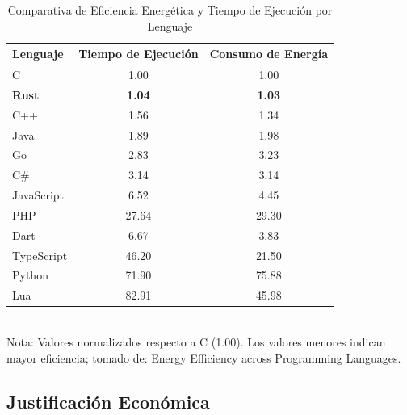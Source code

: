     \begin{table}[H]
        \centering
        \caption{Comparativa de Eficiencia Energética y Tiempo de Ejecución por Lenguaje \parencite{bib:Pereira2017}}
        \label{tab:energy_efficiency}
        \begin{tabular}{l c c} %
            \toprule
            \textbf{Lenguaje} & \textbf{Tiempo de Ejecución} & \textbf{Consumo de Energía} \\
            \midrule
            C           & 1.00  & 1.00 \\
            \textbf{Rust} & \textbf{1.04} & \textbf{1.03} \\
            C++         & 1.56  & 1.34 \\
            Java        & 1.89  & 1.98 \\
            Go          & 2.83  & 3.23 \\
            C\#         & 3.14  & 3.14 \\
            JavaScript  & 6.52  & 4.45 \\
            PHP         & 27.64 & 29.30 \\
            Dart        & 6.67  & 3.83 \\
            TypeScript  & 46.20 & 21.50 \\
            Python      & 71.90 & 75.88 \\
            Lua         & 82.91 & 45.98 \\
            \bottomrule
        \end{tabular}
        \vspace{0.2cm}
        \small \\ %
            Nota: Valores normalizados respecto a C (1.00). Los valores menores indican mayor eficiencia; tomado de: Energy Efficiency across Programming Languages.

    \end{table}
\subsection{Justificación Económica}